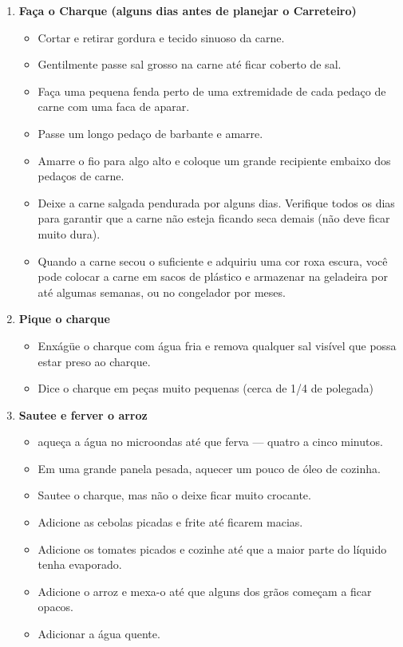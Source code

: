 \documentclass [11pt, letterpaper] {article}
\begin{document}
\begin {description}
\begin {enumerate}
\item {\bf Faça o Charque (alguns dias antes de planejar o Carreteiro)}
\begin {itemize}
\item Cortar e retirar gordura e tecido sinuoso da carne.
\item Gentilmente passe sal grosso na carne até ficar coberto de sal.
\item Faça uma pequena fenda perto de uma extremidade de cada pedaço de carne com uma faca de aparar.
\item Passe um longo pedaço de barbante e amarre.
\item Amarre o fio para algo alto e coloque um grande recipiente embaixo dos pedaços de carne.
\item Deixe a carne salgada pendurada por alguns dias. Verifique todos os dias para garantir que a carne não esteja ficando seca demais (não deve ficar muito dura).
\item Quando a carne secou o suficiente e adquiriu uma cor roxa escura, você pode colocar a carne em sacos de plástico e armazenar na geladeira por até algumas semanas, ou no congelador por meses.
\end {itemize}
\item {\bf Pique o charque}
\begin {itemize}
\item Enxágüe o charque com água fria e remova qualquer sal visível que possa estar preso ao charque.
\item Dice o charque em peças muito pequenas (cerca de 1/4 de polegada)
\end {itemize}
\item {\bf Sautee e ferver o arroz}
\begin {itemize}
\item aqueça a água no microondas até que ferva --- quatro a cinco minutos.
\item Em uma grande panela pesada, aquecer um pouco de óleo de cozinha.
\item Sautee o charque, mas não o deixe ficar muito crocante.
\item Adicione as cebolas picadas e frite até ficarem macias.
\item Adicione os tomates picados e cozinhe até que a maior parte do líquido tenha evaporado.
\item Adicione o arroz e mexa-o até que alguns dos grãos começam a ficar opacos.
\item Adicionar a água quente.

\end{itemize}
\end{enumerate}
\end{description}
\end{document}
